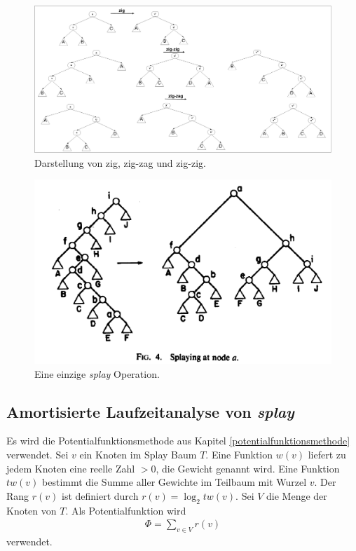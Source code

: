 \documentclass[a4paper,12pt]{article}
\begin{document}
\begin{figure}[h]
	\centering
	\includegraphics[width= 1.2\textwidth]{"Medien/Splaybaum/zigZag"}
	\caption{Darstellung von zig, zig-zag und zig-zig. }
	\label{fig:zigZag}
\end{figure}
\begin{figure}[h]
	\centering
	\includegraphics[width= 1\textwidth]{"Medien/Splaybaum/splay"}
	\caption{Eine einzige \textit{splay } Operation.\cite{splay}}
	\label{fig:splay}
\end{figure}

\subsection{Amortisierte Laufzeitanalyse von \textit{splay }}
Es wird die Potentialfunktionsmethode aus Kapitel \ref{potentialfunktionsmethode} verwendet. Sei $v$ ein Knoten im Splay Baum $T$. Eine Funktion $w\left(v\right)$ liefert zu jedem Knoten eine reelle Zahl $>0$, die Gewicht genannt wird. Eine Funktion $\mathit{tw}\left(v\right)$ bestimmt die Summe aller Gewichte im Teilbaum mit Wurzel $v$. Der Rang  $r\left(v\right)$ ist definiert durch $r\left(v\right) = \log_2  \mathit{tw}\left(v\right)$. Sei $V$ die Menge der Knoten von $T$. Als Potentialfunktion wird 
\begin{align*}
\Phi = \sum_{v \in V} r\left(v\right)
\end{align*}
verwendet.
\end{document}
